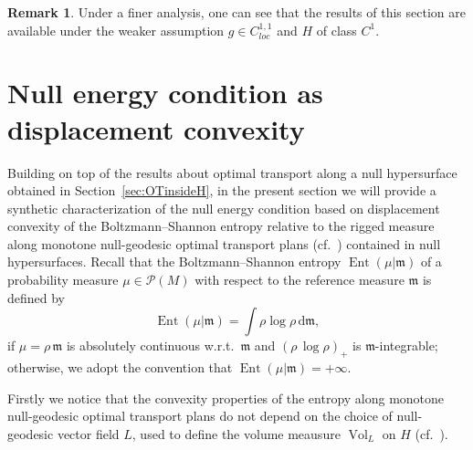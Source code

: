 \documentclass[12pt,a4paper]{amsart}
\theoremstyle{plain}
\theoremstyle{definition}
\newtheorem{remark}[lemma]{Remark}
\numberwithin{equation}{section}
\DeclareMathOperator{\Ent}{Ent}
\DeclareMathOperator{\vol}{Vol}
\newcommand{\de}{{\mathrm{d}}}
\newcommand{\Prob}{\mathcal P}
\newcommand{\mm}{\mathfrak m}
\begin{document}
  \begin{remark}
    Under a finer analysis, one can see that the results of this
    section are available under the weaker assumption $g\in C^{1,1}_{loc}$ and
    $H$ of class $C^1$.
  \end{remark}

%


\section{Null energy condition as displacement convexity}\label{sec:NCe}


Building on top of the results about optimal transport along a null hypersurface obtained in Section~\ref{sec:OTinsideH}, in the present section we will provide a synthetic characterization of the null energy condition based on displacement convexity of the Boltzmann--Shannon entropy relative to the rigged measure along monotone null-geodesic optimal transport plans (cf.\ ) contained in null hypersurfaces.
Recall that the Boltzmann--Shannon entropy $\Ent(\mu|\mm)$ of a probability measure $\mu\in \Prob(M)$ with respect to the reference measure $\mm$ is defined by
\begin{equation}\label{eq:defSBEnt}
\Ent(\mu|\mm)=\int \rho \log \rho \, \de\mm,
\end{equation}
if $\mu=\rho\,\mm$ is absolutely continuous w.r.t.\ $\mm$ and $\left(\rho \, \log \rho \right)_+$ is $\mm$-integrable; otherwise, we adopt the convention that $\Ent(\mu|\mm)=+\infty$.






Firstly we notice that the convexity properties of the entropy along monotone null-geodesic optimal transport plans do not depend on the choice of null-geodesic vector field $L$, used to define the volume meausure $\vol_L$ on $H$ (cf.\ ).
\end{document}
